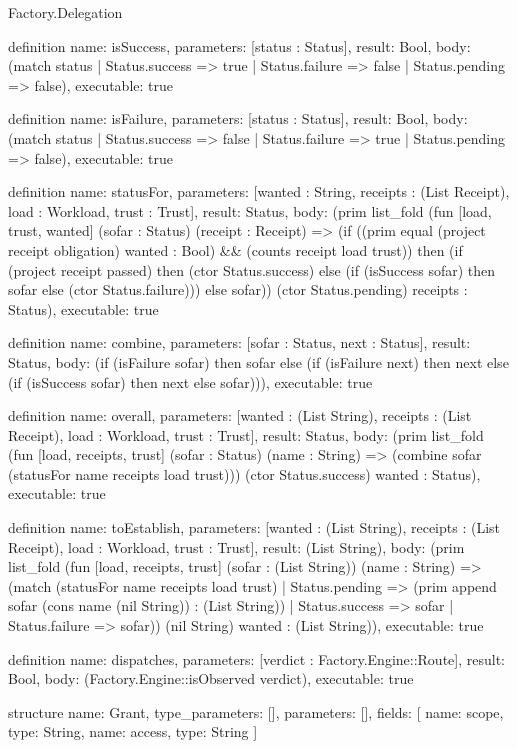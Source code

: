 \begin{lexlean}{Factory.Delegation}
\begin{semanticmodule}
definition{
  name: isSuccess,
  parameters: [status : Status],
  result: Bool,
  body: (match status
    | Status.success => true
    | Status.failure => false
    | Status.pending => false),
  executable: true
}

definition{
  name: isFailure,
  parameters: [status : Status],
  result: Bool,
  body: (match status
    | Status.success => false
    | Status.failure => true
    | Status.pending => false),
  executable: true
}

definition{
  name: statusFor,
  parameters: [wanted : String, receipts : (List Receipt), load : Workload, trust : Trust],
  result: Status,
  body: (prim list_fold (fun [load, trust, wanted] (sofar : Status) (receipt : Receipt) => (if ((prim equal (project receipt obligation) wanted : Bool) && (counts receipt load trust)) then (if (project receipt passed) then (ctor Status.success) else (if (isSuccess sofar) then sofar else (ctor Status.failure))) else sofar)) (ctor Status.pending) receipts : Status),
  executable: true
}

definition{
  name: combine,
  parameters: [sofar : Status, next : Status],
  result: Status,
  body: (if (isFailure sofar) then sofar else (if (isFailure next) then next else (if (isSuccess sofar) then next else sofar))),
  executable: true
}

definition{
  name: overall,
  parameters: [wanted : (List String), receipts : (List Receipt), load : Workload, trust : Trust],
  result: Status,
  body: (prim list_fold (fun [load, receipts, trust] (sofar : Status) (name : String) => (combine sofar (statusFor name receipts load trust))) (ctor Status.success) wanted : Status),
  executable: true
}

definition{
  name: toEstablish,
  parameters: [wanted : (List String), receipts : (List Receipt), load : Workload, trust : Trust],
  result: (List String),
  body: (prim list_fold (fun [load, receipts, trust] (sofar : (List String)) (name : String) => (match (statusFor name receipts load trust)
      | Status.pending => (prim append sofar (cons name (nil String)) : (List String))
      | Status.success => sofar
      | Status.failure => sofar)) (nil String) wanted : (List String)),
  executable: true
}

definition{
  name: dispatches,
  parameters: [verdict : Factory.Engine::Route],
  result: Bool,
  body: (Factory.Engine::isObserved verdict),
  executable: true
}

structure{
  name: Grant,
  type_parameters: [],
  parameters: [],
  fields: [
    {name: scope, type: String},
    {name: access, type: String}
  ]
}


\end{semanticmodule}
\end{lexlean}
